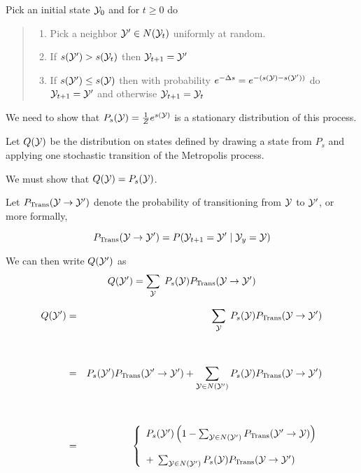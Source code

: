 {

Pick an initial state ${\cal Y}_0$ and for $t \geq 0$ do

\vfill
\begin{quotation}

    \noindent \begin{enumerate}
    \item Pick a neighbor ${\cal Y}' \in N({\cal Y}_t)$ uniformly at random.

    \vfill      
    \item If $s({\cal Y}') > s({\cal Y}_t)$ then {\color{red} ${\cal Y}_{t+1} = {\cal Y}'$}

    \vfill      
    \item If $s({\cal Y}') \leq s({\cal Y})$ then with probability $e^{-\Delta s} = e^{-(s({\cal Y}) - s({\cal Y}'))}$
   do  {\color{red} ${\cal Y}_{t+1} = {\cal Y}'$} and otherwise {\color{red} ${\cal Y}_{t+1} = {\cal Y}_t$} 
  \end{enumerate}  
\end{quotation}

We need to show that $P_s({\cal Y}) = \frac{1}{Z}e^{s({\cal Y})}$ is a stationary distribution of this process.

\vfill
Let $Q({\cal Y})$ be the distribution on states defined by drawing a state from $P_s$ and applying one stochastic transition of the Metropolis process.

\vfill
We must show that $Q({\cal Y}) = P_s({\cal Y})$.

Let $P_{\mathrm{Trans}}({\cal Y} \rightarrow {\cal Y}')$ denote the probability of transitioning from ${\cal Y}$ to ${\cal Y}'$, or more formally,

\vfill
$$P_{\mathrm{Trans}}({\cal Y} \rightarrow {\cal Y}') = P({\cal Y}_{t+1} = {\cal Y}'\;|\; {\cal Y}_y = {\cal Y})$$

\vfill
We can then write $Q({\cal Y}')$ as
\vfill
$$Q({\cal Y}') =  \sum_{{\cal Y}}\;P_s({\cal Y})P_\mathrm{Trans}({\cal Y} \rightarrow {\cal Y}')$$


{\huge
\begin{eqnarray*}
Q({\cal Y}')& = &  \sum_{{\cal Y}}\;P_s({\cal Y})P_\mathrm{Trans}({\cal Y} \rightarrow {\cal Y}') \\
\\
\\
& = & P_s({\cal Y'})P_\mathrm{Trans}({\cal Y}' \rightarrow {\cal Y}') + \sum_{{\cal Y} \in N({\cal Y}')} P_s({\cal Y}){P_{\mathrm{Trans}}({\cal Y} \rightarrow {\cal Y}')} \\
\\
\\
& = & \left\{\begin{array}{l}P_s({\cal Y}')\left(1-\sum_{{\cal Y} \in N({\cal Y'})} P_\mathrm{Trans}({\cal Y}'\rightarrow {\cal Y})\right) \\
\\
  + \; \sum_{{\cal Y} \in N({\cal Y}')} P_s({\cal Y}){P_{\mathrm{Trans}}({\cal Y} \rightarrow {\cal Y}')}\end{array}\right.
\end{eqnarray*}
}

}
